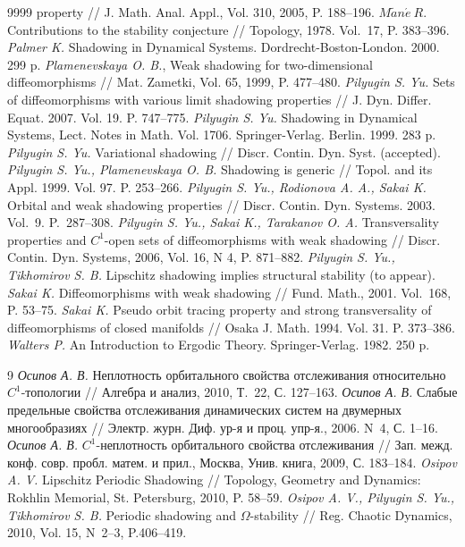 \documentclass[12pt]{article}
\begin{document}
\begin{thebibliography}{9999}
property // J. Math. Anal. Appl., Vol. 310, 2005, P. 188--196.
\textit{$M\tilde{a}n\acute{e}\ R.$} Contributions to the stability conjecture // Topology, 1978. Vol.~17, P. 383--396.
 \textit{Palmer K.} Shadowing in Dynamical Systems. Dordrecht-Boston-London. 2000. 299 p.  
\textit{Plamenevskaya O. B.}, Weak shadowing for two-dimensional diffeomorphisms //
Mat. Zametki, Vol. 65, 1999, P. 477--480.
 \textit{Pilyugin S. Yu.} Sets of diffeomorphisms with various limit shadowing
properties // J. Dyn. Differ. Equat. 2007. Vol. 19. P. 747--775.
 \textit{Pilyugin S. Yu.} Shadowing in Dynamical Systems, Lect. Notes in Math. Vol. 1706. Springer-Verlag. Berlin. 1999. 283 p. 
\textit{Pilyugin S. Yu.} Variational shadowing // Discr. Contin. Dyn. Syst.
(accepted).
 \textit{Pilyugin S. Yu., Plamenevskaya O. B.} Shadowing is generic // Topol. and its Appl. 1999. Vol. 97. P. 253--266.
 \textit{Pilyugin S. Yu., Rodionova A. A., Sakai K.} Orbital and weak shadowing properties // Discr. Contin. Dyn. Systems. 2003. Vol.~9. P.~287--308.
\textit{Pilyugin S. Yu., Sakai K., Tarakanov O. A.} Transversality properties and
$C^1$-open sets of diffeomorphisms with weak shadowing // Discr. Contin. Dyn. Systems, 2006, Vol. 16, N 4, P. 871--882.
 \textit{Pilyugin S. Yu., Tikhomirov S. B.} Lipschitz shadowing implies
structural stability (to appear).
\textit{Sakai K.} Diffeomorphisms with weak shadowing // Fund. Math., 2001. Vol.~168, P. 53--75.
\textit{Sakai K.} Pseudo orbit tracing property and strong
transversality of diffeomorphisms of closed manifolds // Osaka J.
Math. 1994. Vol. 31. P. 373--386.
\textit{Walters P.} An Introduction to Ergodic Theory. Springer-Verlag. 1982. 250 p.
\end{thebibliography}

\renewcommand{\refname}{Публикации автора по теме диссертации}

\begin{thebibliography}{9}
\textit{Осипов А. В.} Неплотность орбитального свойства отслеживания относительно $C^1$-топологии // Алгебра и анализ, 2010, Т.~22, С. 127--163.
\textit{Осипов А. В.} Слабые предельные свойства отслеживания динами\-ческих систем на двумерных многообразиях // Электр. журн. Диф. ур-я и проц. упр-я., 2006. N\ 4, С. 1--16.  
\textit{Осипов А. В.} $C^1$-неплотность орбитального свойства отслеживания // Зап. межд. конф. совр. пробл. матем. и прил., Москва, Унив. книга, 2009, С. 183--184.
\textit{Osipov A. V.} Lipschitz Periodic Shadowing // Topology, Geometry and Dynamics: Rokhlin Memorial, St. Petersburg, 2010, P. 58--59.
\textit{Osipov A. V., Pilyugin S. Yu., Tikhomirov S. B.} Periodic shadowing and $\Omega$-stability // Reg. Chaotic Dynamics, 2010, Vol. 15, N\ 2--3, P.406--419.
\end{thebibliography}
\end{document}
